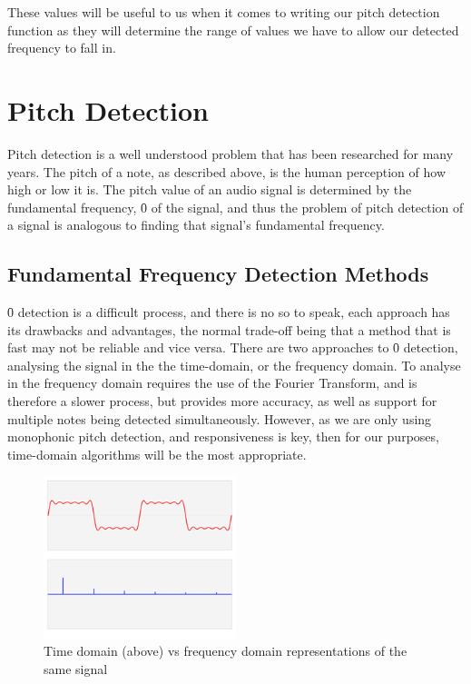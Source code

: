 	These values will be useful to us when it comes to writing our pitch detection function as they will determine the range of values we have to allow our detected frequency to fall in.
	
	\section{Pitch Detection}
	\par
	Pitch detection is a well understood problem that has been researched for many years. The pitch of a note, as described above, is the human perception of how high or low it is. The pitch value of an audio signal is determined by the fundamental frequency, \f0 of the signal, and thus the problem of pitch detection of a signal is analogous to finding that signal's fundamental frequency. 
	
	\subsection{Fundamental Frequency Detection Methods}
	
	\f0 detection is a difficult process, and there is no  so to speak, each approach has its drawbacks and advantages, the normal trade-off being that a method that is fast may not be reliable and vice versa.
	There are two approaches to \f0 detection, analysing the signal in the the time-domain, or the frequency domain. To analyse in the frequency domain requires the use of the Fourier Transform, and is therefore a slower process, but provides more accuracy, as well as support for multiple notes being detected simultaneously. However, as we are only using monophonic pitch detection, and responsiveness is key, then for our purposes, time-domain algorithms will be the most appropriate.
	\begin{figure}[h!]
  		\caption{Time domain (above) vs frequency domain representations of the same signal}
  		\centering
    	\includegraphics[width=0.5\textwidth]{assets/time-frequency.png}
	\end{figure}
